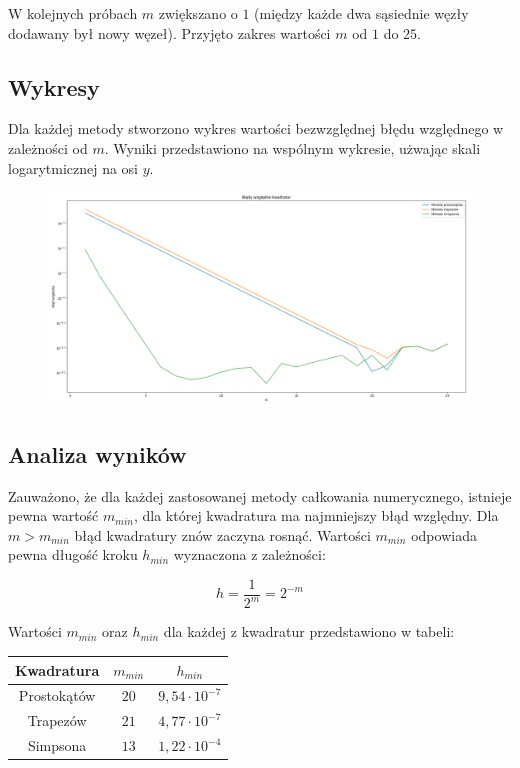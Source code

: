 \documentclass{article}
\begin{document}
	W kolejnych próbach $m$ zwiększano o $1$ (między każde dwa sąsiednie węzły dodawany był nowy węzeł). Przyjęto zakres wartości $m$ od $1$ do $25$.

	\subsection*{Wykresy}

	Dla każdej metody stworzono wykres wartości bezwzględnej błędu względnego w zależności od $m$. Wyniki przedstawiono na wspólnym wykresie, użwając skali logarytmicznej na osi $y$. 

	\begin{figure}[h]
		\centering
		\includegraphics[scale = 0.3]{wykres1.png}
	\end{figure}


	\subsection*{Analiza wyników}

	Zauważono, że dla każdej zastosowanej metody całkowania numerycznego, istnieje pewna wartość $m_{min}$, dla której kwadratura ma najmniejszy błąd względny. Dla $m > m_{min}$ błąd kwadratury znów zaczyna rosnąć. Wartości $m_{min}$ odpowiada pewna długość kroku $h_{min}$ wyznaczona z zależności:

	\begin{equation}
		h = \frac{1}{2^m} = 2^{-m}
	\end{equation}

	Wartości $m_{min}$ oraz $h_{min}$ dla każdej z kwadratur przedstawiono w tabeli:

	\begin{center}
		\begin{tabular}{c|c|c}
  			\hline 
  			Kwadratura & $m_{min}$ & $h_{min}$ \\
			\hline
			Prostokątów & $20$ & $9,54 \cdot 10 ^ {-7}$ \\
			Trapezów & $21$ & $4,77 \cdot 10 ^ {-7}$ \\
			Simpsona & $13$ & $1,22 \cdot 10 ^ {-4}$ \\
			
		\end{tabular} 
		
	\end{center}	
\end{document}
